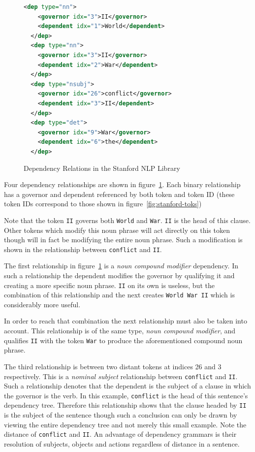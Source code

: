 \begin{figure}
\begin{lstlisting}[language=xml,style=mystyle]
  <dep type="nn">
    <governor idx="3">II</governor>
    <dependent idx="1">World</dependent>
  </dep>
  <dep type="nn">
    <governor idx="3">II</governor>
    <dependent idx="2">War</dependent>
  </dep>
  <dep type="nsubj">
    <governor idx="26">conflict</governor>
    <dependent idx="3">II</dependent>
  </dep>
  <dep type="det">
    <governor idx="9">War</governor>
    <dependent idx="6">the</dependent>
  </dep>
\end{lstlisting}
\caption{Dependency Relations in the Stanford NLP Library}
\label{fig:stanford-deps}
\end{figure}

Four dependency relationships are shown in figure~\ref{fig:stanford-deps}.  Each binary relationship has a governor and dependent referenced by both token and token ID (these token IDs correspond to those shown in figure~\ref{fig:stanford-toks}) 

Note that the token \verb|II| governs both \verb|World| and \verb|War|.  \verb|II| is the head of this clause.  Other tokens which modify this noun phrase will act directly on this token though will in fact be modifying the entire noun phrase.  Such a modification is shown in the relationship between \verb|conflict| and \verb|II|.

The first relationship in figure~\ref{fig:stanford-deps} is a \emph{noun compound modifier} dependency.  In such a relationship the dependent modifies the governor by qualifying it and creating a more specific noun phrase.  \verb|II| on its own is useless, but the combination of this relationship and the next creates \verb|World War II| which is considerably more useful. 

In order to reach that combination the next relationship must also be taken into account.  This relationship is of the same type, \emph{noun compound modifier}, and qualifies \verb|II| with the token \verb|War| to produce the aforementioned compound noun phrase.  

The third relationship is between two distant tokens at indices 26 and 3 respectively.  This is a \emph{nominal subject} relationship between \verb|conflict| and \verb|II|.  Such a relationship denotes that the dependent is the subject of a clause in which the governor is the verb.  In this example, \verb|conflict| is the head of this sentence's dependency tree.  Therefore this relationship shows that the clause headed by \verb|II| is the subject of the sentence though such a conclusion can only be drawn by viewing the entire dependency tree and not merely this small example.  Note the distance of \verb|conflict| and \verb|II|.  An advantage of dependency grammars is their resolution of subjects, objects and actions regardless of distance in a sentence.

